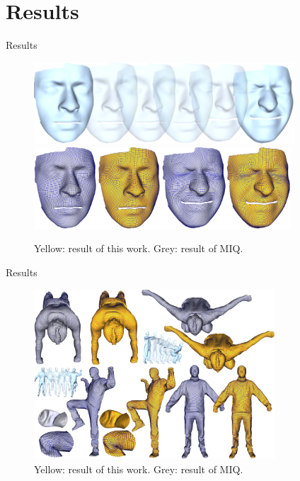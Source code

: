 \documentclass{beamer}
\begin{document}
\section{Results}
\begin{frame}{Results}
\begin{figure}[!htb]
\centering
\includegraphics[height=1.2in]{./img/face-seq-2.png}\\
\includegraphics[height=1.2in]{./img/face-quad-2.png}
\caption{Yellow: result of this work. Grey: result of MIQ.}
\end{figure}
\end{frame}

\begin{frame}{Results}
\begin{figure}[!htb]
\centering
\includegraphics[height=2.5in]{./img/human-seq.png}
\caption{Yellow: result of this work. Grey: result of MIQ.}
\end{figure}
\end{frame}
\end{document}
